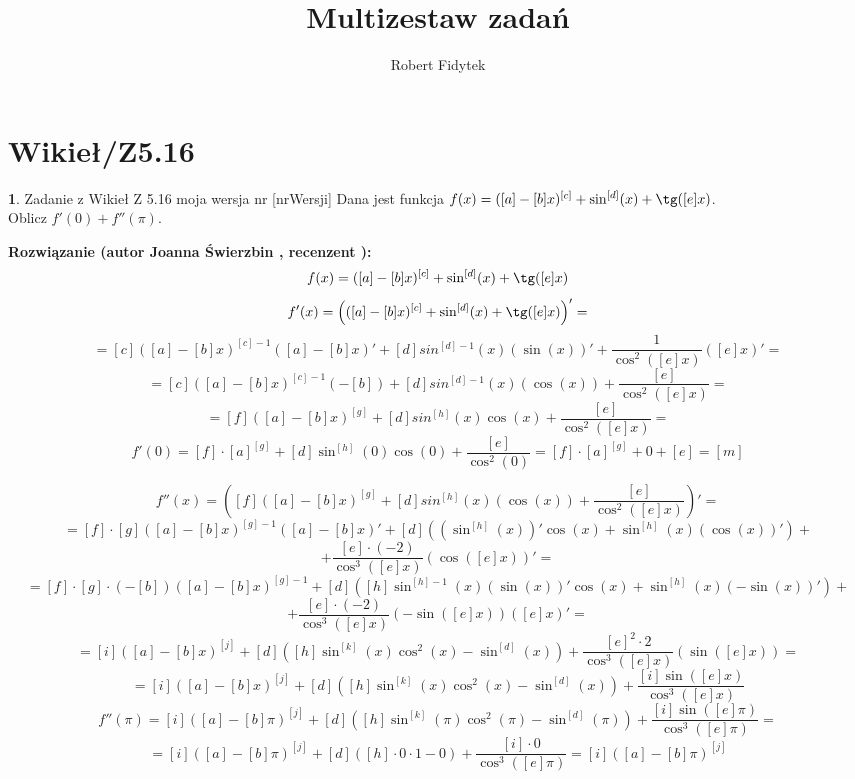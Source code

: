 \documentclass[12pt, a4paper]{article}
\title{Multizestaw zadań}
\author{Robert Fidytek}
\date{}
\theoremstyle{definition} %
\newtheorem{zad}{}
\newcommand{\kategoria}[1]{\section{#1}} %
\newcommand{\zadStart}[1]{\begin{zad}#1\newline} %
\newcommand{\zadStop}{\end{zad}}   %
\newcommand{\rozwStart}[2]{\noindent \textbf{Rozwiązanie (autor #1 , recenzent #2): }\newline} %
\begin{document}
\maketitle


\kategoria{Wikieł/Z5.16}
\zadStart{Zadanie z Wikieł Z 5.16 moja wersja nr [nrWersji]}
Dana jest funkcja $f(x)=([a]-[b]x)^{[c]}+\sin^{[d]}(x)+\tg([e]x)$.\\ Oblicz $f'(0)+f''(\pi)$.
\zadStop
\rozwStart{Joanna Świerzbin}{}
$$f(x)=([a]-[b]x)^{[c]}+\sin^{[d]}(x)+\tg([e]x)$$
$$f'(x)= \left( ([a]-[b]x)^{[c]}+\sin^{[d]}(x)+\tg([e]x) \right)' = $$ 
$$= [c]\left([a]-[b]x\right)^{[c]-1}\left([a]-[b]x\right)'+[d]sin^{[d]-1}\left(x\right)\left(\sin\left(x\right)\right)'+\frac{1}{\cos^2\left([e]x\right)}\left([e]x\right)' = $$
$$= [c]\left([a]-[b]x\right)^{[c]-1}\left(-[b]\right)+[d]sin^{[d]-1}\left(x\right)\left(\cos\left(x\right)\right)+\frac{[e]}{\cos^2\left([e]x\right)}= $$
$$= [f]\left([a]-[b]x\right)^{[g]}+[d]sin^{[h]}\left(x\right)\cos\left(x\right)+\frac{[e]}{\cos^2\left([e]x\right)}= $$
$$f'(0)=[f]\cdot[a]^{[g]}+[d]\sin^{[h]}(0) \cos(0)+\frac{[e]}{\cos^2(0)} = [f]\cdot[a]^{[g]} +0 + [e] = [m] $$

$$f''(x)=\left( [f]\left([a]-[b]x\right)^{[g]}+[d]sin^{[h]}\left(x\right)\left(\cos\left(x\right)\right)+\frac{[e]}{\cos^2\left([e]x\right)} \right)'= $$
$$= [f]\cdot[g]\left([a]-[b]x\right)^{[g]-1}\left([a]-[b]x\right)'+[d]\left( \left(\sin^{[h]}(x) \right)' \cos(x)+\sin^{[h]}(x)\left(\cos(x)\right)'\right)+ $$ $$+\frac{[e]\cdot(-2)}{\cos^3\left([e]x\right)}\left( \cos([e]x)\right)' = $$
$$= [f]\cdot[g]\cdot(-[b])\left([a]-[b]x\right)^{[g]-1}+[d]\left( [h]\sin^{[h]-1}(x) \left( \sin(x)\right)' \cos(x)+\sin^{[h]}(x)\left(-\sin(x)\right)'\right)+ $$ $$+\frac{[e]\cdot(-2)}{\cos^3\left([e]x\right)}\left( -\sin([e]x)\right)\left( [e]x\right)' = $$
$$= [i]\left([a]-[b]x\right)^{[j]}+[d]\left( [h]\sin^{[k]}(x) \cos^2(x)-\sin^{[d]}(x)\right)+ \frac{[e]^2\cdot2}{\cos^3\left([e]x\right)}\left(\sin([e]x)\right) = $$
$$= [i]\left([a]-[b]x\right)^{[j]}+[d]\left( [h]\sin^{[k]}(x) \cos^2(x)-\sin^{[d]}(x)\right)+ \frac{[i] \sin([e]x) }{\cos^3\left([e]x\right)} $$
$$f''(\pi)=[i]\left([a]-[b]\pi \right)^{[j]}+[d]\left( [h]\sin^{[k]}(\pi) \cos^2(\pi)-\sin^{[d]}(\pi)\right)+ \frac{[i] \sin([e]\pi) }{\cos^3\left([e]\pi\right)}=$$
$$=[i]\left([a]-[b]\pi \right)^{[j]}+[d]\left( [h]\cdot 0\cdot 1 - 0 \right)+ \frac{[i] \cdot 0 }{\cos^3\left([e]\pi\right)}=
[i]\left([a]-[b]\pi \right)^{[j]}$$
\end{document}

